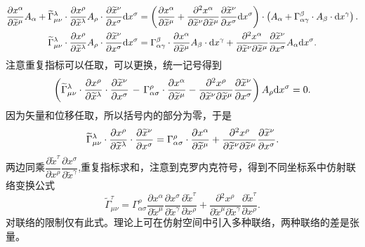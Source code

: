 \documentclass[11pt, a4paper, oneside, onecolumn]{ctexart}
\numberwithin{equation}{subsection}
\begin{document}
\begin{align}
\frac{\partial{}x^{\alpha}}{\partial{}\widetilde{x}^{\mu}}A_{\alpha}+\widetilde{\Gamma}_{\mu\nu}^{\lambda}\cdot\frac{\partial{}x^{\rho}}{\partial{}\widetilde{x}^{\lambda}}A_{\rho}\cdot\frac{\partial{}\widetilde{x}^{\nu}}{\partial{}x^{\sigma}}\mathrm{d}x^{\sigma}&=\left(\frac{\partial{}x^{\alpha}}{\partial{}\widetilde{x}^{\mu}}+\frac{\partial{}^{2}x^{\alpha}}{\partial{}\widetilde{x}^{\nu}\partial{}\widetilde{x}^{\mu}}\frac{\partial{}\widetilde{x}^{\nu}}{\partial{}x^{\sigma}}\mathrm{d}x^{\sigma}\right)\cdot\left(A_{\alpha}+\Gamma_{\alpha\gamma}^{\beta}\cdot A_{\beta}\cdot\mathrm{d}x^{\gamma}\right).\notag\\
\widetilde{\Gamma}_{\mu\nu}^{\lambda}\cdot\frac{\partial{}x^{\rho}}{\partial{}\widetilde{x}^{\lambda}}A_{\rho}\cdot\frac{\partial{}\widetilde{x}^{\nu}}{\partial{}x^{\sigma}}\mathrm{d}x^{\sigma}&=\Gamma_{\alpha\gamma}^{\beta}\cdot\frac{\partial{}x^{\alpha}}{\partial{}\widetilde{x}^{\mu}}A_{\beta}\cdot\mathrm{d}x^{\gamma}+\frac{\partial{}^{2}x^{\alpha}}{\partial{}\widetilde{x}^{\nu}\partial{}\widetilde{x}^{\mu}}\frac{\partial{}\widetilde{x}^{\nu}}{\partial{}x^{\sigma}}A_{\alpha}\mathrm{d}x^{\sigma}.\notag
\end{align}
注意重复指标可以任取，可以更换，统一记号得到
\begin{equation}
\left(\widetilde{\Gamma}_{\mu\nu}^{\lambda}\cdot\frac{\partial{}x^{\rho}}{\partial{}\widetilde{x}^{\lambda}}\cdot\frac{\partial{}\widetilde{x}^{\nu}}{\partial{}x^{\sigma}}\right.-\left.\Gamma_{\alpha\sigma}^{\rho}\cdot\frac{\partial{}x^{\alpha}}{\partial{}\widetilde{x}^{\mu}}-\frac{\partial{}^{2}x^{\rho}}{\partial{}\widetilde{x}^{\nu}\partial{}\widetilde{x}^{\mu}}\frac{\partial{}\widetilde{x}^{\nu}}{\partial{}x^{\sigma}}\right)A_{\rho}\mathrm{d}x^{\sigma}=0.\notag
\end{equation}
因为矢量和位移任取，所以括号内的部分为零，于是
\begin{equation}
\widetilde{\Gamma}_{\mu\nu}^{\lambda}\cdot\frac{\partial{}x^{\rho}}{\partial{}\widetilde{x}^{\lambda}}\cdot\frac{\partial{}\widetilde{x}^{\nu}}{\partial{}x^{\sigma}}=\Gamma_{\alpha\sigma}^{\rho}\cdot\frac{\partial{}x^{\alpha}}{\partial{}\widetilde{x}^{\mu}}+\frac{\partial{}^{2}x^{\rho}}{\partial{}\widetilde{x}^{\nu}\partial{}\widetilde{x}^{\mu}}\frac{\partial{}\widetilde{x}^{\nu}}{\partial{}x^{\sigma}}.\notag
\end{equation}
两边同乘$\dfrac{\partial{}\widetilde{x}^{\tau}}{\partial{}x^{\rho}}\dfrac{\partial{}x^{\sigma}}{\partial{}\widetilde{x}^{\gamma}}$,重复指标求和，注意到克罗内克符号，得到不同坐标系中仿射联络变换公式
\begin{equation}
\widetilde{\Gamma}_{\mu\nu}^{\tau}=\Gamma_{\alpha\sigma}^{\rho}\frac{\partial{}x^{\alpha}}{\partial{}\widetilde{x}^{\mu}}\frac{\partial{}x^{\sigma}}{\partial{}\widetilde{x}^{\gamma}}\frac{\partial{}\widetilde{x}^{\tau}}{\partial{}x^{\rho}}+\frac{\partial{}^{2}x^{\rho}}{\partial{}\widetilde{x}^{\mu}\partial\widetilde{x}^{\gamma}}\frac{\partial{}\widetilde{x}^{\tau}}{\partial{}x^{\rho}}.
\end{equation}
对联络的限制仅有此式。理论上可在仿射空间中引入多种联络，两种联络的差是张量。
\end{document}
